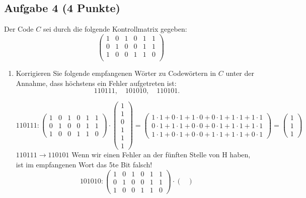 \documentclass{article} %
\begin{document}
\subsection*{Aufgabe 4 (4 Punkte)}
Der Code $C$ sei durch die folgende Kontrollmatrix gegeben:
\[
\begin{pmatrix}
1 & 0 & 1 & 0 & 1 & 1 \\
0 & 1 & 0 & 0 & 1 & 1 \\
1 & 0 & 0 & 1 & 1 & 0 \\
\end{pmatrix}
\]
\begin{enumerate}
    \item[(a)] Korrigieren Sie folgende empfangenen Wörter zu Codewörtern in $C$ unter der Annahme, dass höchstens ein Fehler aufgetreten ist:
    \[
    110111, \quad 101010, \quad 110101.
    \]
     \begin{mybox}
    \[
    110111: 
\begin{pmatrix} 
1 & 0 & 1 & 0 & 1 & 1 \\
0 & 1 & 0 & 0 & 1 & 1 \\
1 & 0 & 0 & 1 & 1 & 0
\end{pmatrix} 
\cdot 
\begin{pmatrix} 
1 \\
1 \\
0 \\
1 \\
1 \\
1
\end{pmatrix}
= \begin{pmatrix}
1 \cdot 1 + 0 \cdot 1 + 1 \cdot 0 + 0 \cdot 1 + 1 \cdot 1 + 1 \cdot 1 \\
0 \cdot 1 + 1 \cdot 1 + 0 \cdot 0 + 0 \cdot 1 + 1 \cdot 1 + 1 \cdot 1 \\
1 \cdot 1 + 0 \cdot 1 + 0 \cdot 0 + 1 \cdot 1 + 1 \cdot 1 + 0 \cdot 1
\end{pmatrix}
= \begin{pmatrix}
1 \\
1 \\
1
\end{pmatrix}
\]
$ 110111 \rightarrow 110101$
Wenn wir einen Fehler an der fünften Stelle von H haben, ist im empfangenen Wort das 5te Bit falsch!
\[
101010: 
\begin{pmatrix} 
1 & 0 & 1 & 0 & 1 & 1 \\
0 & 1 & 0 & 0 & 1 & 1 \\
1 & 0 & 0 & 1 & 1 & 0
\end{pmatrix}
\cdot 
\begin{pmatrix} 

\end{pmatrix}\]
\end{mybox}
\end{enumerate}
\end{document}
